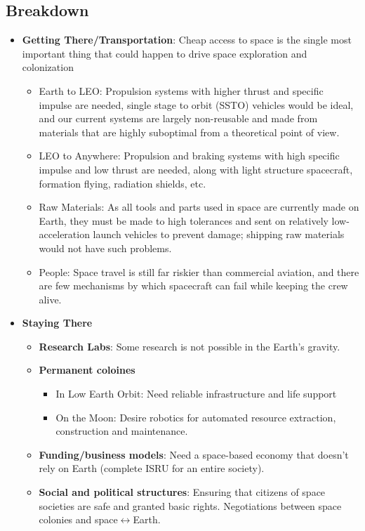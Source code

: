 \documentclass[letter,11pt]{article}
\begin{document}
\subsection{Breakdown}
\begin{itemize}
	\item \textbf{Getting There/Transportation}: Cheap access to space is the single most important thing that could happen to drive space exploration and colonization \begin{itemize}
				\item Earth to LEO: Propulsion systems with higher thrust and specific impulse are needed, single stage to orbit (SSTO) vehicles would be ideal, and our current systems are largely non-reusable and made from materials that are highly suboptimal from a theoretical point of view.
				\item LEO to Anywhere: Propulsion and braking systems with high specific impulse and low thrust are needed, along with light structure spacecraft, formation flying, radiation shields, etc.
				\item Raw Materials: As all tools and parts used in space are currently made on Earth, they must be made to high tolerances and sent on relatively low-acceleration launch vehicles to prevent damage; shipping raw materials would not have such problems.
				\item People: Space travel is still far riskier than commercial aviation, and there are few mechanisms by which spacecraft can fail while keeping the crew alive.
			\end{itemize}
	\item \textbf{Staying There} \begin{itemize}
			\item \textbf{Research Labs}: Some research is not possible in the Earth's gravity.
			\item \textbf{Permanent coloines} \begin{itemize}
					\item In Low Earth Orbit: Need reliable infrastructure and life support
					\item On the Moon: Desire robotics for automated resource extraction, construction and maintenance.
				\end{itemize}
			\item \textbf{Funding/business models}: Need a space-based economy that doesn't rely on Earth (complete ISRU for an entire society).
			\item \textbf{Social and political structures}: Ensuring that citizens of space societies are safe and granted basic rights. Negotiations between space colonies and space$\leftrightarrow$Earth.

\end{itemize}
\end{itemize}
\end{document}
